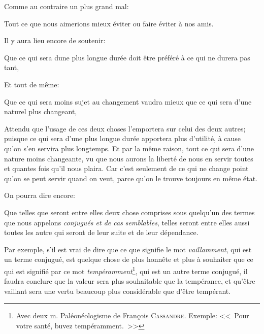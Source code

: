 Comme au contraire un plus grand mal:

\begin{emphpar}
    Tout ce que nous aimerions mieux éviter ou faire éviter à nos amis.
\end{emphpar}

\bigbreak

Il y aura lieu encore de soutenir:

\begin{emphpar}
    Que ce qui sera dune plus longue durée doit être préféré à ce qui ne durera pas tant,
\end{emphpar}

Et tout de même:

\begin{emphpar}
    Que ce qui sera moins sujet au changement vaudra mieux que ce qui sera d'une naturel plus changeant,
\end{emphpar}

Attendu que l'usage de ces deux choses l'emportera sur celui des deux autres; puisque ce qui sera d'une plus
longue durée apportera plus d'utilité, à cause qu'on s'en servira plus longtemps. Et par la même raison, tout
ce qui sera d'une nature moins changeante, vu que nous aurons la liberté de nous en servir toutes et quantes
fois qu'il nous plaira. Car c'est seulement de ce qui ne change point qu'on se peut servir quand on veut, parce
qu'on le trouve toujours en même état.

\bigbreak

On pourra dire encore:

\begin{emphpar}
    Que telles que seront entre elles deux chose comprises sous quelqu'un des termes que nous appelons \emph{
	conjugués et de cas semblables}, telles seront entre elles aussi toutes les autre qui seront de leur suite
	et de leur dépendance.
\end{emphpar}

Par exemple, s'il est vrai de dire que ce que signifie le mot \emph{vaillamment}, qui est un terme conjugué, est
quelque chose de plus honnête et plus à souhaiter que ce qui est signifié par ce mot \emph{tempéramment}\footnote{
Avec deux m. Paléonéologisme de François \textsc{Cassandre}. Exemple: <<~Pour votre santé, buvez tempéramment.~>>},
qui est un autre terme conjugué, il faudra conclure que la valeur sera plus souhaitable que la tempérance, et qu'être
vaillant sera une vertu beaucoup plus considérable que d'être tempérant.

\bigbreak

